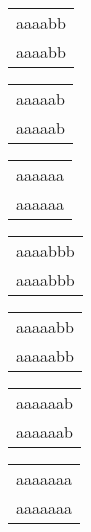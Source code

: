 \begin{tabular}{|l|} \hline
aaaabb \\
aaaabb \\
\hline
\end{tabular} 
\begin{tabular}{|l|} \hline
aaaaab \\
aaaaab \\
\hline
\end{tabular} 
\begin{tabular}{|l|} \hline
aaaaaa \\
aaaaaa \\
\hline
\end{tabular} 
\begin{tabular}{|l|} \hline
aaaabbb \\
aaaabbb \\
\hline
\end{tabular} 
\begin{tabular}{|l|} \hline
aaaaabb \\
aaaaabb \\
\hline
\end{tabular} 
\begin{tabular}{|l|} \hline
aaaaaab \\
aaaaaab \\
\hline
\end{tabular} 
\begin{tabular}{|l|} \hline
aaaaaaa \\
aaaaaaa \\
\hline
\end{tabular} 
